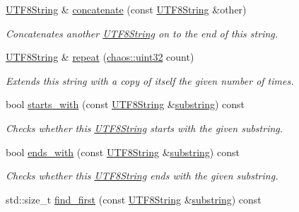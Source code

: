 \begin{DoxyCompactItemize}
\hyperlink{classchaos_1_1uni_1_1_u_t_f8_string}{U\+T\+F8\+String} \& \hyperlink{classchaos_1_1uni_1_1_u_t_f8_string_a7d8ef533d14720da24ea4926daa2bc3f}{concatenate} (const \hyperlink{classchaos_1_1uni_1_1_u_t_f8_string}{U\+T\+F8\+String} \&other)
\begin{DoxyCompactList}\small\item\em Concatenates another \hyperlink{classchaos_1_1uni_1_1_u_t_f8_string}{U\+T\+F8\+String} on to the end of this string. \end{DoxyCompactList}\item 
\hyperlink{classchaos_1_1uni_1_1_u_t_f8_string}{U\+T\+F8\+String} \& \hyperlink{classchaos_1_1uni_1_1_u_t_f8_string_aae17e9b7d3522e4b504d7d0b5ec22b6e}{repeat} (\hyperlink{namespacechaos_a8641b3ae4551f0b35570d4f9f4ec22d9}{chaos\+::uint32} count)
\begin{DoxyCompactList}\small\item\em Extends this string with a copy of itself the given number of times. \end{DoxyCompactList}\item 
bool \hyperlink{classchaos_1_1uni_1_1_u_t_f8_string_aa4c4a2af7ab4fd921b47a3cb6942ce32}{starts\+\_\+with} (const \hyperlink{classchaos_1_1uni_1_1_u_t_f8_string}{U\+T\+F8\+String} \&\hyperlink{classchaos_1_1uni_1_1_u_t_f8_string_a6a92e0b096b7d0087e3c784fa7f891aa}{substring}) const 
\begin{DoxyCompactList}\small\item\em Checks whether this \hyperlink{classchaos_1_1uni_1_1_u_t_f8_string}{U\+T\+F8\+String} starts with the given substring. \end{DoxyCompactList}\item 
bool \hyperlink{classchaos_1_1uni_1_1_u_t_f8_string_abdf7eeafa6a476ea484d7a2a0e5060e5}{ends\+\_\+with} (const \hyperlink{classchaos_1_1uni_1_1_u_t_f8_string}{U\+T\+F8\+String} \&\hyperlink{classchaos_1_1uni_1_1_u_t_f8_string_a6a92e0b096b7d0087e3c784fa7f891aa}{substring}) const 
\begin{DoxyCompactList}\small\item\em Checks whether this \hyperlink{classchaos_1_1uni_1_1_u_t_f8_string}{U\+T\+F8\+String} ends with the given substring. \end{DoxyCompactList}\item 
std\+::size\+\_\+t \hyperlink{classchaos_1_1uni_1_1_u_t_f8_string_a45f75e01bd07e664369c81758a0f0537}{find\+\_\+first} (const \hyperlink{classchaos_1_1uni_1_1_u_t_f8_string}{U\+T\+F8\+String} \&\hyperlink{classchaos_1_1uni_1_1_u_t_f8_string_a6a92e0b096b7d0087e3c784fa7f891aa}{substring}) const 

\end{DoxyCompactItemize}
